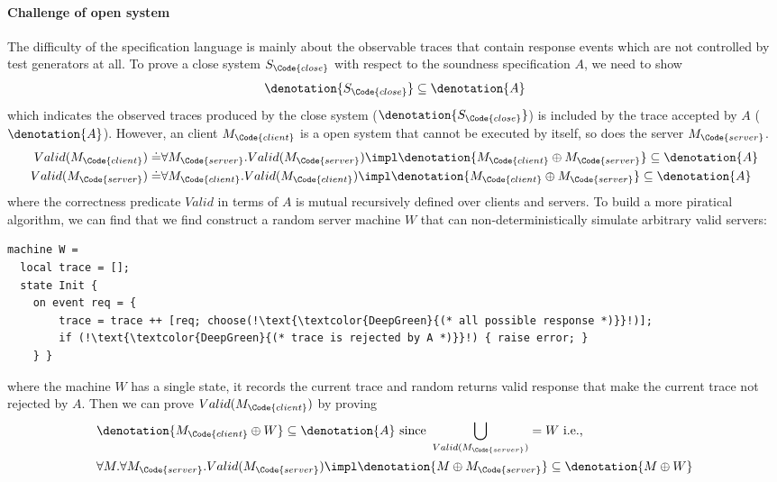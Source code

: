 \paragraph{Challenge of open system} The difficulty of the specification language is mainly about the observable traces that contain response events which are not controlled by test generators at all. To prove a close system $S_{\Code{close}}$ with respect to the soundness specification $A$, we need to show
\begin{align*}
    \denotation{S_{\Code{close}}} \subseteq \denotation{A}
\end{align*}\noindent
which indicates the observed traces produced by the close system ($\denotation{S_{\Code{close}}}$) is included by the trace accepted by $A$ ($\denotation{A}$). However, an client $M_{\Code{client}}$ is a open system that cannot be executed by itself, so does the server $M_{\Code{server}}$. 
\begin{align*}
     Valid(M_{\Code{client}}) \doteq&
    \forall M_{\Code{server}}. Valid(M_{\Code{server}}) \impl 
    \denotation{M_{\Code{client}} \oplus M_{\Code{server}}} \subseteq  \denotation{A}
    \\Valid(M_{\Code{server}}) \doteq&
    \forall M_{\Code{client}}. Valid(M_{\Code{client}}) \impl 
    \denotation{M_{\Code{client}} \oplus M_{\Code{server}}} \subseteq  \denotation{A}
\end{align*}\noindent
where the correctness predicate $Valid$ in terms of $A$ is mutual recursively defined over clients and servers. To build a more piratical algorithm, we can find that we find construct a random server machine $W$ that can non-deterministically simulate arbitrary valid servers:
\begin{verbatim}
machine W =
  local trace = [];
  state Init {
    on event req = {
        trace = trace ++ [req; choose(!\text{\textcolor{DeepGreen}{(* all possible response *)}}!)];
        if (!\text{\textcolor{DeepGreen}{(* trace is rejected by A *)}}!) { raise error; }
    } }
\end{verbatim}
where the machine $W$ has a single state, it records the current trace and random returns valid response that make the current trace not rejected by $A$. Then we can prove $Valid(M_{\Code{client}})$ by proving
\begin{align*}
    &\denotation{M_{\Code{client}} \oplus W} \subseteq  \denotation{A} \text{ since } \bigcup_{ Valid(M_{\Code{server}})} = W \text{ i.e., } 
    \\&\forall M. \forall M_{\Code{server}}. Valid(M_{\Code{server}}) \impl  \denotation{M \oplus M_{\Code{server}}} \subseteq \denotation{M \oplus W}
\end{align*}\noindent

